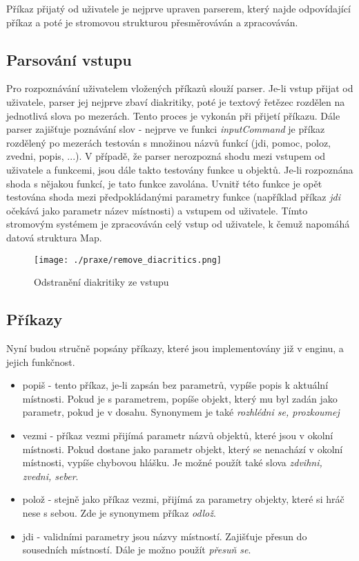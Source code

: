 \documentclass[main.tex]{subfiles}
\begin{document}
Příkaz přijatý od uživatele je nejprve upraven parserem, který najde odpovídající příkaz a poté je stromovou strukturou přesměrováván a zpracováván.

\subsection{Parsování vstupu}
Pro rozpoznávání uživatelem vložených příkazů slouží parser. Je-li vstup přijat od uživatele, parser jej nejprve zbaví diakritiky, poté je textový řetězec rozdělen na jednotlivá slova po mezerách. Tento proces je vykonán při přijetí příkazu. Dále parser zajišťuje poznávání slov - nejprve ve funkci \textit{inputCommand} je příkaz rozdělený po mezerách testován s množinou názvů funkcí (jdi, pomoc, poloz, zvedni, popis, ...). V případě, že parser nerozpozná shodu mezi vstupem od uživatele a funkcemi, jsou dále takto testovány funkce u objektů. Je-li rozpoznána shoda s nějakou funkcí, je tato funkce zavolána. Uvnitř této funkce je opět testována shoda mezi předpokládanými parametry funkce (například příkaz \textit{jdi} očekává jako parametr název místnosti) a vstupem od uživatele. Tímto stromovým systémem je zpracováván celý vstup od uživatele, k čemuž napomáhá datová struktura Map.

		\begin{figure}[h]
			\centering
			\texttt{[image: ./praxe/remove\_diacritics.png]}
			\caption{Odstranění diakritiky ze vstupu}
		\end{figure}
\subsection{Příkazy}
Nyní budou stručně popsány příkazy, které jsou implementovány již v enginu, a jejich funkčnost.
\begin{itemize}
    \item popiš - tento příkaz, je-li zapsán bez parametrů, vypíše popis k aktuální místnosti. Pokud je s parametrem, popíše objekt, který mu byl zadán jako parametr, pokud je v dosahu. Synonymem je také \textit{rozhlédni se, prozkoumej}
    \item vezmi - příkaz vezmi přijímá parametr názvů objektů, které jsou v okolní místnosti. Pokud dostane jako parametr objekt, který se nenachází v okolní místnosti, vypíše chybovou hlášku. Je možné použít také slova \textit{zdvihni, zvedni, seber}.  
    \item polož - stejně jako příkaz vezmi, přijímá za parametry objekty, které si hráč nese s sebou. Zde je synonymem příkaz \textit{odlož}. 
    \item jdi - validními parametry jsou názvy místností. Zajišťuje přesun do sousedních místností. Dále je možno použít \textit{přesuň se}. 
\end{itemize}
\end{document}

